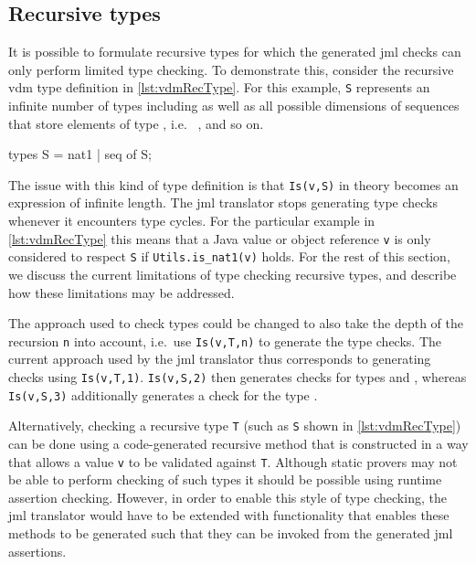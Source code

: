 \subsection{Recursive types}
\label{sec:recursive-types}

It is possible to formulate recursive types for which the generated
\ac{jml} checks can only perform limited type checking. To demonstrate
this, consider the recursive \ac{vdm} type definition in
\autoref{lst:vdmRecType}. For this example, \texttt{S} represents an
infinite number of types including  as well as all possible
dimensions of sequences that store elements of type , i.e.\
  ,    
\kw{nat1} and so on.

\begin{vdmsl}[style=customVdm,caption={Example of recursive type
definition in \ac{vdm}.},label={lst:vdmRecType}]
types
S = nat1 | seq of S;
\end{vdmsl}

\noindent The issue with this kind of type definition is that
\texttt{Is(v,S)} in theory becomes an expression of infinite
length. The \ac{jml} translator stops generating type checks whenever
it encounters type cycles. For the particular example in
\autoref{lst:vdmRecType} this means that a Java value or object
reference \texttt{v} is only considered to respect \texttt{S} if
\texttt{Utils.is\_nat1(v)} holds. For the rest of this section, we
discuss the current limitations of type checking recursive types, and
describe how these limitations may be addressed.

The approach used to check types could be changed to also
take the depth of the recursion \texttt{n} into account, i.e.\ use
\texttt{Is(v,T,n)} to generate the type checks. The current approach
used by the \ac{jml} translator thus corresponds to generating checks
using \texttt{Is(v,T,1)}. \texttt{Is(v,S,2)} then generates checks for
types \kw{nat1} and   \kw{nat}, whereas
\texttt{Is(v,S,3)} additionally generates a check for the type \kw{seq}
\kw{of} \kw{seq} \kw{of} \kw{nat1}.

Alternatively, checking a recursive type \texttt{T} (such as
\texttt{S} shown in \autoref{lst:vdmRecType}) can be done using a
code-generated recursive method that is constructed in a way that
allows a value \texttt{v} to be validated against \texttt{T}. Although
static provers may not be able to perform checking of such types it
should be possible using runtime assertion checking. However, in order
to enable this style of type checking, the \ac{jml} translator would
have to be extended with functionality that enables these methods to
be generated such that they can be invoked from the generated \ac{jml}
assertions.

